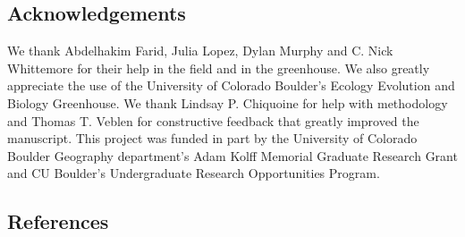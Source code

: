 \documentclass[
  12pt,
]{article}
\begin{document}
\hypertarget{acknowledgements}{%
\subsection{Acknowledgements}\label{acknowledgements}}

We thank Abdelhakim Farid, Julia Lopez, Dylan Murphy and C. Nick
Whittemore for their help in the field and in the greenhouse. We also
greatly appreciate the use of the University of Colorado Boulder's
Ecology Evolution and Biology Greenhouse. We thank Lindsay P. Chiquoine
for help with methodology and Thomas T. Veblen for constructive feedback
that greatly improved the manuscript. This project was funded in part by
the University of Colorado Boulder Geography department's Adam Kolff
Memorial Graduate Research Grant and CU Boulder's Undergraduate Research
Opportunities Program.

\hypertarget{references}{%
\subsection{References}\label{references}}

\singlespacing
\end{document}
